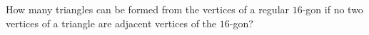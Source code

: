 How many triangles can be formed from the vertices of a regular $16$-gon if no two vertices of a triangle are adjacent vertices of the $16$-gon?
